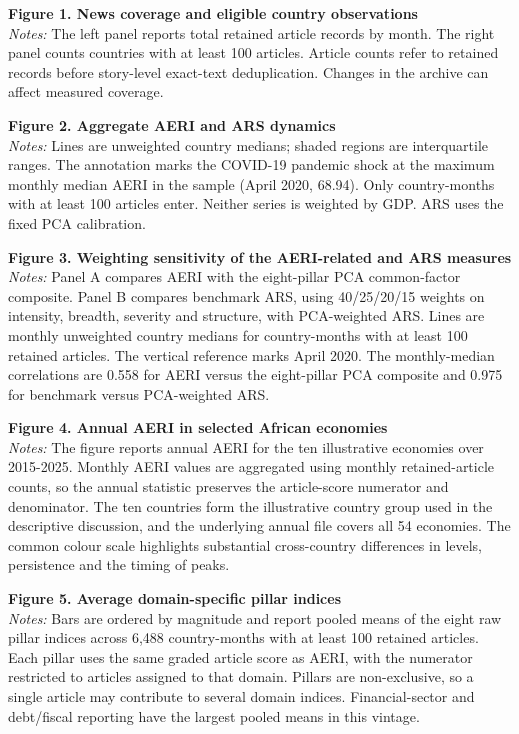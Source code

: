 
\noindent\textbf{Figure 1. News coverage and eligible country observations}\\
\textit{Notes:} The left panel reports total retained article records by month. The right panel counts countries with at least 100 articles. Article counts refer to retained records before story-level exact-text deduplication. Changes in the archive can affect measured coverage.\par\medskip

\noindent\textbf{Figure 2. Aggregate AERI and ARS dynamics}\\
\textit{Notes:} Lines are unweighted country medians; shaded regions are interquartile ranges. The annotation marks the COVID-19 pandemic shock at the maximum monthly median AERI in the sample (April 2020, 68.94). Only country-months with at least 100 articles enter. Neither series is weighted by GDP. ARS uses the fixed PCA calibration.\par\medskip

\noindent\textbf{Figure 3. Weighting sensitivity of the AERI-related and ARS measures}\\
\textit{Notes:} Panel A compares AERI with the eight-pillar PCA common-factor composite. Panel B compares benchmark ARS, using 40/25/20/15 weights on intensity, breadth, severity and structure, with PCA-weighted ARS. Lines are monthly unweighted country medians for country-months with at least 100 retained articles. The vertical reference marks April 2020. The monthly-median correlations are 0.558 for AERI versus the eight-pillar PCA composite and 0.975 for benchmark versus PCA-weighted ARS.\par\medskip

\noindent\textbf{Figure 4. Annual AERI in selected African economies}\\
\textit{Notes:} The figure reports annual AERI for the ten illustrative economies over 2015-2025. Monthly AERI values are aggregated using monthly retained-article counts, so the annual statistic preserves the article-score numerator and denominator. The ten countries form the illustrative country group used in the descriptive discussion, and the underlying annual file covers all 54 economies. The common colour scale highlights substantial cross-country differences in levels, persistence and the timing of peaks.\par\medskip

\noindent\textbf{Figure 5. Average domain-specific pillar indices}\\
\textit{Notes:} Bars are ordered by magnitude and report pooled means of the eight raw pillar indices across 6,488 country-months with at least 100 retained articles. Each pillar uses the same graded article score as AERI, with the numerator restricted to articles assigned to that domain. Pillars are non-exclusive, so a single article may contribute to several domain indices. Financial-sector and debt/fiscal reporting have the largest pooled means in this vintage.\par\medskip

